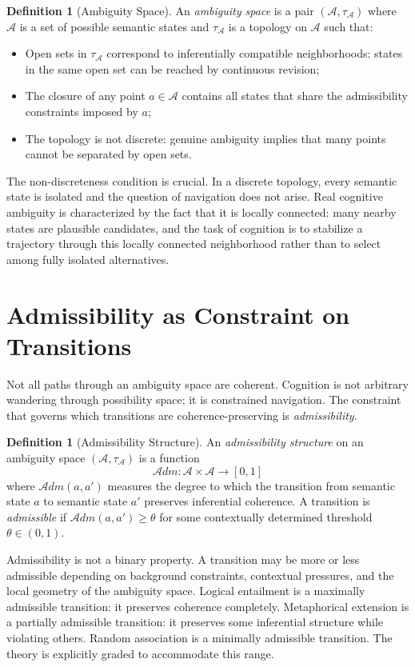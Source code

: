 \documentclass[12pt,oneside]{book}
\theoremstyle{plain}
\theoremstyle{definition}
\newtheorem{definition}[theorem]{Definition}
\theoremstyle{plain}
\newcommand{\cA}{\mathcal{A}}
\begin{document}
\begin{definition}[Ambiguity Space]
An \emph{ambiguity space} is a pair $(\cA, \tau_\cA)$ where $\cA$ is a set of possible semantic states and $\tau_\cA$ is a topology on $\cA$ such that:
\begin{itemize}[noitemsep]
\item[(i)] Open sets in $\tau_\cA$ correspond to inferentially compatible neighborhoods: states in the same open set can be reached by continuous revision;
\item[(ii)] The closure of any point $a \in \cA$ contains all states that share the admissibility constraints imposed by $a$;
\item[(iii)] The topology is not discrete: genuine ambiguity implies that many points cannot be separated by open sets.
\end{itemize}
\end{definition}

The non-discreteness condition is crucial. In a discrete topology, every semantic state is isolated and the question of navigation does not arise. Real cognitive ambiguity is characterized by the fact that it is locally connected: many nearby states are plausible candidates, and the task of cognition is to stabilize a trajectory through this locally connected neighborhood rather than to select among fully isolated alternatives.

\section{Admissibility as Constraint on Transitions}

Not all paths through an ambiguity space are coherent. Cognition is not arbitrary wandering through possibility space; it is constrained navigation. The constraint that governs which transitions are coherence-preserving is \emph{admissibility}.

\begin{definition}[Admissibility Structure]
An \emph{admissibility structure} on an ambiguity space $(\cA, \tau_\cA)$ is a function
\[
\mathcal{A}dm : \cA \times \cA \to [0,1]
\]
where $\mathcal{A}dm(a, a')$ measures the degree to which the transition from semantic state $a$ to semantic state $a'$ preserves inferential coherence. A transition is \emph{admissible} if $\mathcal{A}dm(a, a') \geq \theta$ for some contextually determined threshold $\theta \in (0,1)$.
\end{definition}

Admissibility is not a binary property. A transition may be more or less admissible depending on background constraints, contextual pressures, and the local geometry of the ambiguity space. Logical entailment is a maximally admissible transition: it preserves coherence completely. Metaphorical extension is a partially admissible transition: it preserves some inferential structure while violating others. Random association is a minimally admissible transition. The theory is explicitly graded to accommodate this range.
\end{document}
